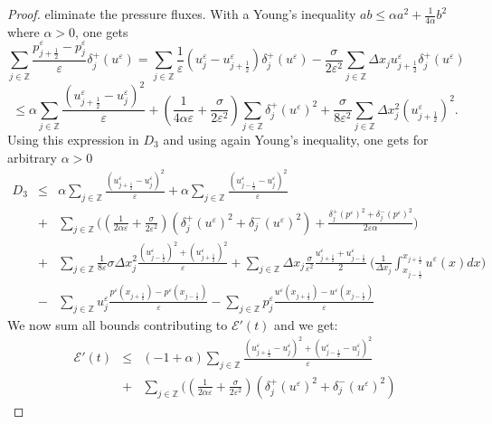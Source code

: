 \documentclass[a4paper,french,english,10pt]{article}
\newcommand\eps{\varepsilon}
\begin{document}
\begin{proof}
eliminate the pressure fluxes. With
 a Young's inequality 
$ab\leq \alpha a^2+\frac1{4\alpha }b^2$ where $\alpha>0$, one gets 
$$
\underset{j\in \mathbb{Z}}{\sum}
\frac{p_{j+\frac12 }^{\eps}-p_{j}^{\eps}}{\eps}
\delta_{j }^+\left( u^{\eps}\right) 
= \sum_{j\in \mathbb{Z}} \frac{1}{\eps} (
u^{\eps}_j-u_{j+\frac12 }^{\eps})\delta_{j }^+\left( u^{\eps}\right) 
 -\frac{\sigma}{2\eps^2}
\sum_{j\in \mathbb{Z}}\Delta x_j 
u_{j+\frac12 }^{\eps}
\delta_{j }^+\left( u^{\eps}\right) 
$$
$$
\leq \alpha \sum_{j\in \mathbb{Z}}
\frac{(u_{j+\frac12 }^{\eps}-u_j^{\eps})^2}{\eps}
+
\left( \frac{1}{4\alpha\eps}+
\frac{\sigma}{2\eps^2}
\right)
\sum_{j\in \mathbb{Z}}
\delta_{j}^+\left(u^{\eps}\right)^2+
\frac\sigma{8\eps^2}
\sum_{j\in \mathbb{Z}}
\Delta x_j^2 \left( u_{j+\frac12 }^{\eps}\right)^2.
$$
Using this expression in $D_3$ and  using again Young's inequality, one gets for 
arbitrary  $\alpha>0$
\begin{eqnarray*}
 D_3 &\leq& \alpha \sum_{j\in \mathbb{Z}}
\frac{(u_{j+\frac12 }^{\eps}-u_j^{\eps})^2}{\eps} + \alpha \sum_{j\in
\mathbb{Z}} \frac{(u_{j-\frac12 }^{\eps}-u_j^{\eps})^2}{\eps} \\
&+&\sum_{j\in \mathbb{Z}} \bigg(
\left( \frac{1}{2\alpha\eps}+\frac{\sigma}{2\eps^2}\right)
\left( 
\delta_{j}^+\left(u^{\eps}\right)^2+
\delta_{j}^-\left(u^{\eps}\right)^2
\right)
+\frac{\delta_{j}^+\left(p^{\eps}\right)^2
+\delta_{j}^-\left(p^{\eps}\right)^2
}{2\eps\alpha} \bigg) \\
&+& \sum_{j\in \mathbb{Z}} \frac{1}{8\eps} \sigma \Delta x_j^2
\frac{(u_{j-\frac12 }^{\eps})^2 + (u_{j+\frac12 }^{\eps})^2}{\eps}+
\sum_{j\in \mathbb{Z}} \Delta x_j  \frac{\sigma}{\eps^2}
\frac{u_{j+\frac12 }^{\eps}+u_{j-\frac12 }^{\eps}}{2}\: \bigg(
\frac{1}{\Delta x_j} {\int_{x_{j-\frac12}}^{x_{j+\frac12}}}u^{\eps}(x) dx \bigg) \\
&-& \sum_{j\in \mathbb{Z}} u^{\eps}_j 
\frac{p^{\eps}(x_{j+\frac12 })-p^{\eps}(x_{j-\frac12 })}{\eps} -
\sum_{j\in \mathbb{Z}} p^{\eps}_j
\frac{u^{\eps}(x_{j+\frac12 })-u^{\eps}(x_{j-\frac12 })}{\eps}
\end{eqnarray*}
We now sum  all  bounds contributing to $\mathscr{E}'(t)$ and we get:
\begin{eqnarray*}
\mathscr{E}'(t)  & \leq & (-1+\alpha) \sum_{j\in \mathbb{Z}}
\frac{(u_{j+\frac12 }^{\eps}-u_j^{\eps})^2+(u_{j-\frac12 }^{\eps}-u_j^{
\eps})^2}{\eps} \\
&+&\sum_{j\in \mathbb{Z}} \bigg(
\left( \frac{1}{2\alpha\eps}+\frac{\sigma}{2\eps^2}\right)
\left ( \delta_{j}^+(u^{\eps})^2+\delta_{j}^-(u^{\eps})^2\right )

\end{eqnarray*}
\end{proof}
\end{document}
